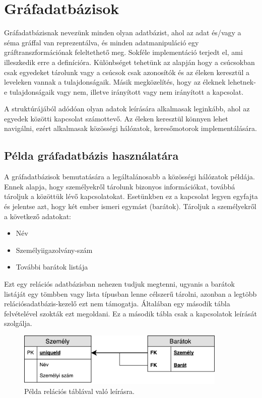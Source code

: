 \chapter{Gráfadatbázisok}

Gráfadatbázisnak nevezünk minden olyan adatbázist, ahol az adat és/vagy a séma gráffal van reprezentálva, és minden adatmanipuláció egy gráftranszformációnak feleltethető meg. Sokféle implementáció terjedt el, ami illeszkedik erre a definícióra. Különbséget tehetünk az alapján hogy a csúcsokban csak egyedeket tárolunk vagy a csúcsok csak azonosítók és az éleken keresztül a leveleken vannak a tulajdonságaik. Másik megközelítés, hogy az éleknek lehetnek-e tulajdonságaik vagy nem, illetve irányított vagy nem irányított a kapcsolat. 

A struktúrájából adódóan olyan adatok leírására alkalmasak leginkább, ahol az egyedek közötti kapcsolat számottevő. Az éleken keresztül könnyen lehet navigálni, ezért alkalmasak közösségi hálózatok, keresőmotorok implementálására. 

\section{Példa gráfadatbázis használatára}

A gráfadatbázisok bemutatására a legáltalánosabb a közösségi hálózatok példája. Ennek alapja, hogy személyekről tárolunk bizonyos információkat, továbbá tároljuk a közöttük lévő kapcsolatokat. Esetünkben ez a kapcsolat legyen egyfajta és jelentse azt, hogy két ember ismeri egymást (barátok). Tároljuk a személyekről a következő adatokat:
\begin{itemize}
	\item Név
	\item Személyiigazolvány-szám
	\item További barátok listája
\end{itemize} 
Ezt egy relációs adatbázisban nehezen tudjuk megtenni, ugyanis a barátok listáját egy tömbben vagy lista típusban lenne célszerű tárolni, azonban a legtöbb relációsadatbázis-kezelő ezt nem támogatja. Általában egy második tábla felvételével szokták ezt megoldani. Ez a második tábla csak a kapcsolatok leírását szolgálja.

\begin{figure}[H]
	\centering
	\includegraphics[width=100mm]{figures/RelaciosPelda.pdf}
	\caption{Példa relációs táblával való leírásra.}
	\label{fig:relaciosPelda}
\end{figure}

